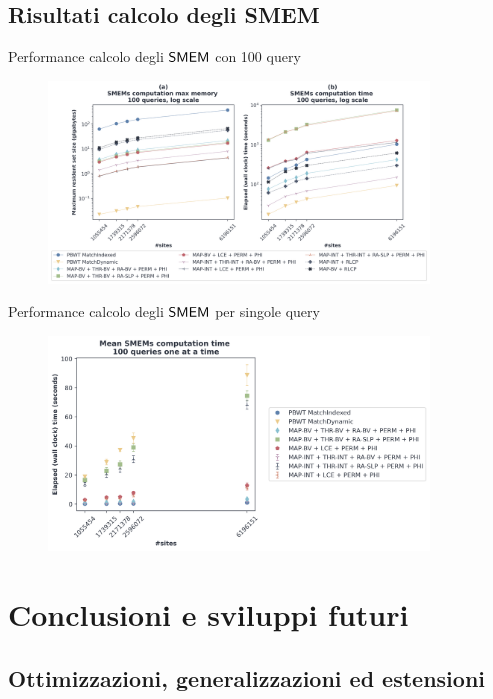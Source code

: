 \documentclass{beamer}
\def\SMEM{\mbox{\rm {\sf SMEM}}}
\begin{document}
\subsection{Risultati calcolo degli SMEM}
\begin{frame}{Performance calcolo degli $\SMEM$ con 100 query}
  \begin{figure}[H]
    \centering
    \includegraphics[width=0.9\textwidth]{img/exe_time_mem_paper.png}
  \end{figure}
\end{frame}
\begin{frame}{Performance calcolo degli $\SMEM$ per singole query}
  \begin{figure}[H]
    \centering
    \includegraphics[width=0.9\textwidth]{img/exe_time_single_paper.png}
  \end{figure}
\end{frame}
\section{Conclusioni e sviluppi futuri}
\subsection{Ottimizzazioni, generalizzazioni ed estensioni}
\end{document}
